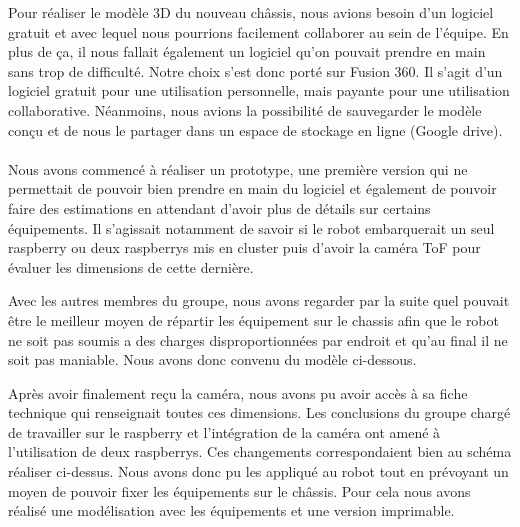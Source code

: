 \documentclass{PackagerQualityN}
\begin{document}
\vspace{0cm}
\vspace{0cm}

Pour réaliser le modèle 3D du nouveau châssis, nous avions besoin d'un logiciel gratuit et avec lequel nous pourrions facilement collaborer au sein de l'équipe. En plus de ça, il nous fallait également un logiciel qu'on pouvait prendre en main sans trop de difficulté.
Notre choix s’est donc porté sur Fusion 360.
Il s'agit d'un logiciel gratuit pour une utilisation personnelle, mais payante pour une utilisation collaborative. Néanmoins, nous avions la possibilité de sauvegarder le modèle conçu et de nous le partager dans un espace de stockage en ligne (Google drive).\\
\\
Nous avons commencé à réaliser un prototype, une première version qui ne permettait de pouvoir bien prendre en main du logiciel et également de pouvoir faire des estimations en attendant d'avoir plus de détails sur certains équipements. Il s'agissait notamment de savoir si le robot embarquerait un seul raspberry ou deux raspberrys mis en cluster puis d'avoir la caméra ToF pour évaluer les dimensions de cette dernière.

\vspace{0.5cm}
\vspace{0.5cm}

Avec les autres membres du groupe, nous avons regarder par la suite quel pouvait être le meilleur moyen de répartir les équipement sur le chassis afin que le robot ne soit pas soumis a des charges disproportionnées par endroit et qu'au final il ne soit pas maniable. Nous avons donc convenu du modèle ci-dessous.

\vspace{0.5cm}
\vspace{0.5cm}

Après avoir finalement reçu la caméra, nous avons pu avoir accès à sa fiche technique qui renseignait toutes ces dimensions. Les conclusions du groupe chargé de travailler sur le raspberry et l'intégration de la caméra ont amené à l'utilisation de deux raspberrys. Ces changements correspondaient bien au schéma réaliser ci-dessus. Nous avons donc pu les appliqué au robot tout en prévoyant un moyen de pouvoir fixer les équipements sur le châssis. Pour cela nous avons réalisé une modélisation avec les équipements et une version imprimable.
      
\end{document}
